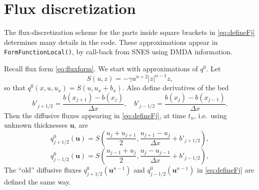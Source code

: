\documentclass[11pt]{amsart}
\newcommand\bu{\mathbf{u}}
\begin{document}
\section{Flux discretization}

The flux-discretization scheme for the parts inside square brackets in \eqref{eq:defineFj} determines many details in the code.  These approximations appear in \verb|FormFunctionLocal()|, by call-back from SNES using DMDA information.

Recall flux form \eqref{eq:fluxform}.  We start with approximations of $q^0$.  Let
	$$S(u,z) = - \gamma u^{n+2} |z|^{n-1} z,$$
so that $q^0(x,u,u_x) = S(u,u_x+b_x)$.  Also define derivatives of the bed
	$$b'_{j+1/2} = \frac{b(x_{j+1}) - b(x_j)}{\Delta x}, \quad b'_{j-1/2} = \frac{b(x_j) - b(x_{j-1})}{\Delta x}.$$
Then the diffusive fluxes appearing in \eqref{eq:defineFj}, at time $t_n$, i.e.~using unknown thicknesses $\bu$, are
    $$q^0_{j+1/2}(\bu) = S\left(\frac{u_j+u_{j+1}}{2},\frac{u_{j+1}-u_j}{\Delta x} + b'_{j+1/2}\right),$$
    $$q^0_{j-1/2}(\bu) = S\left(\frac{u_{j-1}+u_j}{2},\frac{u_j-u_{j-1}}{\Delta x} + b'_{j-1/2}\right),$$
The ``old'' diffusive fluxes $q^0_{j+1/2}(\bu^{n-1})$ and $q^0_{j-1/2}(\bu^{n-1})$ in \eqref{eq:defineFj} are defined the same way.
\end{document}
